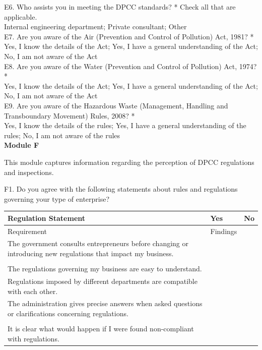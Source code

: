 \documentclass[a4paper, 12pt, twoside]{article}
\begin{document}
\begin{mdframed}[backgroundcolor=gray!20]
		E6. Who assists you in meeting the DPCC standards? * Check all that are applicable. \\
		
		Internal engineering department; Private consultant; Other \\
		
		E7. Are you aware of the Air (Prevention and Control of Pollution) Act, 1981? * \\
		
		Yes, I know the details of the Act; Yes, I have a general understanding of the Act; No, I am not aware of the Act \\
		
		E8. Are you aware of the Water (Prevention and Control of Pollution) Act, 1974? * \\
		
		Yes, I know the details of the Act; Yes, I have a general understanding of the Act; No, I am not aware of the Act \\
		
		E9. Are you aware of the Hazardous Waste (Management, Handling and Transboundary Movement) Rules, 2008? * \\
		
		Yes, I know the details of the rules; Yes, I have a general understanding of the rules; No, I am not aware of the rules \\
		
		\textbf{Module F}
		
		This module captures information regarding the perception of DPCC regulations and inspections.	
		
		F1. Do you agree with the following statements about rules and regulations governing your type of enterprise?
		
		\begin{longtable}{>{\raggedright}p{7.5cm}>{\raggedright\arraybackslash}p{3.25cm}>{\raggedright\arraybackslash}p{3.25cm}}
\toprule
Regulation Statement & Yes & No \\
\midrule
\endfirsthead
\toprule
Requirement & Findings \\
\midrule
\endhead
\endfoot
\endlastfoot
The government consults entrepreneurs before changing or introducing new regulations that impact my business. \\
&  & \\
The regulations governing my business are easy to understand. &  & \\
Regulations imposed by different departments are compatible with each other. &  & \\
The administration gives precise answers when asked questions or clarifications concerning regulations. \\
&  & \\
It is clear what would happen if I were found non-­compliant with regulations. &  & \\
\bottomrule
		\end{longtable}
		

\end{mdframed}
\end{document}
